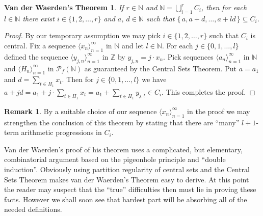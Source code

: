 \documentclass[12pt]{article}
\theoremstyle{plain}
\newtheorem*{vdw}{Van der Waerden's Theorem}
\theoremstyle{definition}
\newtheorem{rmk}[thm]{Remark}
\newcommand{\la}{\langle}
\newcommand{\ra}{\rangle}
\newcommand{\bbN}{\mathbb{N}}
\newcommand{\bbZ}{\mathbb{Z}}
\newcommand{\Pf}{\mathcal{P}_f}
\begin{document}
\begin{vdw}
  If $r \in \bbN$ and $\bbN = \bigcup_{i=1}^r C_i$, then for each $l
  \in \bbN$ there exist $i \in \{1, 2, \ldots, r\}$ and $a$, $d \in
  \bbN$ such that $\{\, a, a+d, \ldots, a+ld \,\} \subseteq C_i$.
\end{vdw}
\begin{proof}
  By our temporary assumption we may pick $i \in \{1, 2, \ldots, r\}$
  such that $C_i$ is central. 
  Fix a sequence $\la x_n \ra_{n=1}^\infty$ in $\bbN$ and let $l \in
  \bbN$.
  For each $j \in \{0, 1, \ldots, l\}$ defined the sequence $\la
  y_{j,n} \ra_{n=1}^\infty$ in $\bbZ$ by $y_{j,n} = j \cdot x_n$. 
  Pick sequences $\la a_n \ra_{n=1}^\infty$ in $\bbN$ and $\la H_n
  \ra_{n=1}^\infty$ in $\Pf(\bbN)$ as guaranteed by the Central Sets
  Theorem. 
  Put $a = a_1$ and $d = \sum_{t \in H_1} x_t$. 
  Then for $j \in \{0, 1, \ldots, l\}$ we have $a+jd = a_1 +
  j\cdot\sum_{t \in H_1} x_t = a_1 + \sum_{t \in H_1} y_{j,t} \in C_i$.
  This completes the proof.
\end{proof}
\begin{rmk}
  By a suitable choice of our sequence $\la x_n \ra_{n=1}^\infty$ in
  the proof we may strengthen the conclusion of this theorem by
  stating that there are ``many'' $l+1$-term arithmetic progressions
  in $C_i$. 
\end{rmk}

Van der Waerden's proof of his theorem \cite{Van-der-Waerden:1927fk}
uses a complicated, but elementary, combinatorial argument based on
the pigeonhole principle and ``double induction''.%
Obviously using partition regularity of central sets and the Central
Sets Theorem makes van der Waerden's Theorem easy to derive.
At this point the reader may suspect that the ``true'' difficulties
then must lie in proving these facts. 
However we shall soon see that hardest part will be absorbing all of
the needed definitions. 
\end{document}
